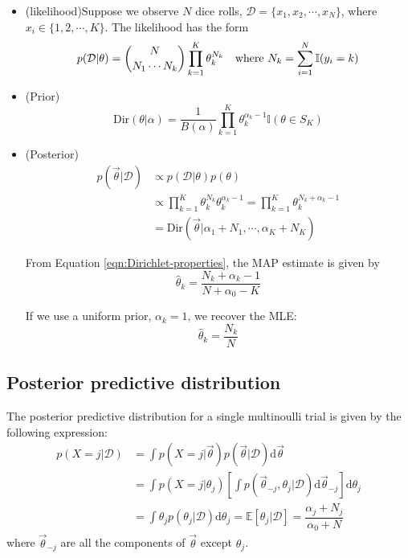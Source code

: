 \begin{refsection}
\begin{lemma}
\begin{itemize}
	\item (likelihood)Suppose we observe $N$ dice rolls, $\mathcal{D}=\{x_1,x_2,\cdots,x_N\}$, where $x_i \in \{1,2,\cdots,K\}$. The likelihood has the form
	\begin{equation*}
	p(\mathcal{D}|\theta) = \dbinom{N}{N_1 \cdots N_k} \prod\limits_{k=1}^K\theta_k^{N_k} \quad \text{where } N_k=\sum\limits_{i=1}^N \mathbb{I}(y_i=k)
	\end{equation*}
	\item (Prior)\begin{equation*}
	\text{Dir}(\theta|\alpha) = \dfrac{1}{B(\alpha)}\prod_{k=1}^K \theta_k^{\alpha_k-1}\mathbb{I}(\theta \in S_K)
	\end{equation*}
	\item (Posterior)
	\begin{align}
	p(\vec{\theta}|\mathcal{D})& \propto p(\mathcal{D}|\theta)p(\theta) \\
	& \propto \prod\limits_{k=1}^K\theta_k^{N_k}\theta_k^{\alpha_k-1} = \prod\limits_{k=1}^K\theta_k^{N_k+\alpha_k-1}\\
	& =\text{Dir}(\vec{\theta}|\alpha_1+N_1,\cdots,\alpha_K+N_K)
	\end{align}
	
	From Equation \ref{eqn:Dirichlet-properties}, the MAP estimate is given by
	\begin{equation*}\label{eqn:Dir-MAP}
	\hat{\theta}_k=\dfrac{N_k+\alpha_k-1}{N+\alpha_0-K}
	\end{equation*}
	
	If we use a uniform prior, $\alpha_k=1$, we recover the MLE:
	\begin{equation*}\label{eqn:Dirichlet-multinomial-posterior-MLE}
	\hat{\theta}_k=\dfrac{N_k}{N}
	\end{equation*}
\end{itemize}	
\end{lemma}




\subsection{Posterior predictive distribution}
The posterior predictive distribution for a single multinoulli trial is given by the following expression:
\begin{align}
p(X=j|\mathcal{D})& =\int p(X=j|\vec{\theta})p(\vec{\theta}|\mathcal{D})\mathrm{d}\vec{\theta} \\
& =\int p(X=j|\theta_j)\left[\int p(\vec{\theta}_{-j}, \theta_j|\mathcal{D})\mathrm{d}\vec{\theta}_{-j}\right]\mathrm{d}\theta_j \\
& =\int \theta_jp(\theta_j|\mathcal{D})\mathrm{d}\theta_j=\mathbb{E}[\theta_j|\mathcal{D}]=\dfrac{\alpha_j+N_j}{\alpha_0+N}
\end{align}
where $\vec{\theta}_{-j}$ are all the components of $\vec{\theta}$ except $\theta_j$.


\end{refsection}

